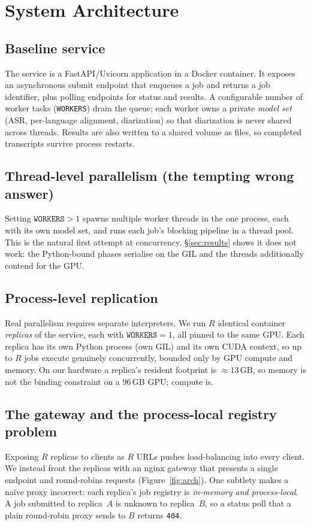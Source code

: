 \documentclass[10pt]{article}
\begin{document}
\section{System Architecture}
\label{sec:arch}

\subsection{Baseline service}
The service is a FastAPI/Uvicorn application in a Docker container. It exposes an
asynchronous submit endpoint that enqueues a job and returns a job identifier,
plus polling endpoints for status and results. A configurable number of worker
tasks (\texttt{WORKERS}) drain the queue; each worker owns a private
\emph{model set} (ASR, per-language alignment, diarization) so that diarization
is never shared across threads. Results are also written to a shared volume as
files, so completed transcripts survive process restarts.

\subsection{Thread-level parallelism (the tempting wrong answer)}
Setting $\texttt{WORKERS}>1$ spawns multiple worker threads in the one process,
each with its own model set, and runs each job's blocking pipeline in a thread
pool. This is the natural first attempt at concurrency. \S\ref{sec:results}
shows it does not work: the Python-bound phases serialise on the GIL and the
threads additionally contend for the GPU.

\subsection{Process-level replication}
Real parallelism requires separate interpreters. We run $R$ identical container
\emph{replicas} of the service, each with $\texttt{WORKERS}=1$, all pinned to the
same GPU. Each replica has its own Python process (own GIL) and its own CUDA
context, so up to $R$ jobs execute genuinely concurrently, bounded only by GPU
compute and memory. On our hardware a replica's resident footprint is
$\approx 13$\,GB, so memory is not the binding constraint on a $96$\,GB GPU;
compute is.

\subsection{The gateway and the process-local registry problem}
\label{sec:gateway}
Exposing $R$ replicas to clients as $R$ URLs pushes load-balancing into every
client. We instead front the replicas with an nginx gateway that presents a
single endpoint and round-robins requests (Figure~\ref{fig:arch}). One subtlety
makes a na\"ive proxy incorrect: each replica's job registry is \emph{in-memory and process-local}. A
job submitted to replica~$A$ is unknown to replica~$B$, so a status poll that a
plain round-robin proxy sends to $B$ returns \texttt{404}.
\end{document}
